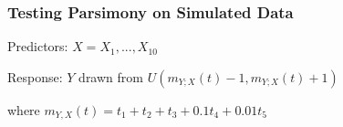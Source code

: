\documentclass{beamer}
\begin{document}
\author[Christopher Patton]{C. Patton, A. Rumbaugh, T. Provan, O. Prilepova, J. Chen}

\begin{frame}
\frametitle{}
\end{frame}

\begin{frame}
\frametitle{}
\end{frame}

\begin{frame}
\frametitle{}
\end{frame}

\begin{frame}
\frametitle{}
\end{frame}

\begin{frame}
\frametitle{}
\end{frame}


\author[Thomas Provan]{C. Patton, A. Rumbaugh, T. Provan, O. Prilepova, J. Chen}

\begin{frame}
\frametitle{Testing Parsimony on Simulated Data}

Predictors: $X = X_1,..., X_10$

Response: $Y$ drawn from $U(m_{Y;X}(t) - 1, m_{Y;X}(t) + 1)$

\vspace{1 mm}

\hspace{8 mm} where $m_{Y,X}(t) = t_1 + t_2 + t_3 + 0.1t_4 + 0.01t_5$

\vspace{1 mm}


\end{frame}
\end{document}
